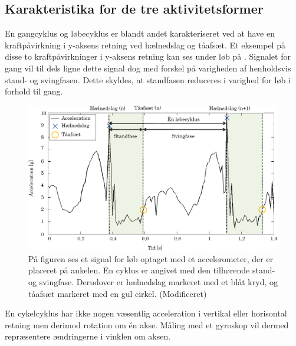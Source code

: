 \subsection{Karakteristika for de tre aktivitetsformer}
En gangcyklus og løbecyklus er blandt andet karakteriseret ved at have en kraftpåvirkning i y-aksens retning ved hælnedslag og tåafsæt. Et eksempel på disse to kraftpåvirkninger i y-aksens retning kan ses under løb på . Signalet for gang vil til dels ligne dette signal dog med forskel på varigheden af henholdsvis stand- og svingfasen. Dette skyldes, at standfasen reduceres i varighed for løb i forhold til gang. %
\begin{figure}[H]
	\centering
	\includegraphics[scale=0.55]{figures/bProblemloesning/loeb_skolebog.png}
	\caption{På figuren ses et signal for løb optaget med et accelerometer, der er placeret på ankelen. En cyklus er angivet med den tilhørende stand- og svingfase. Derudover er hælnedslag markeret med et blåt kryd, og tåafsæt markeret med en gul cirkel. \citep{WeyandKelly2001} (Modificeret)}
	\label{fig:loeb_skolebog}
\end{figure}

En cykelcyklus har ikke nogen væsentlig acceleration i vertikal eller horisontal retning men derimod rotation om én akse. Måling med et gyroskop vil dermed repræsentere ændringerne i vinklen om aksen. \citep{Cockcroft2011,Marin-PerianuMarin-Perianu2013}


